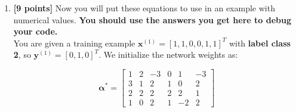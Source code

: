 \documentclass[11pt]{article}
\numberwithin{equation}{section} %
\numberwithin{figure}{section} %
\numberwithin{table}{section} %
\newcommand{\av}{\mathbf{a}}
\newcommand{\bv}{\mathbf{b}}
\newcommand{\xv}{\mathbf{x}}
\newcommand{\yv}{\mathbf{y}}
\newcommand{\zv}{\mathbf{z}}
\newcommand{\betav      }{\boldsymbol \beta      }
\newcommand{\points}[1]{{\bf [#1 points]}}
\begin{document}
\begin{enumerate}
\begin{enumerate}
        
        
        
        \item \points{1} What is the derivative $\frac{d\ell}{d\zv}$? Your answer should be in terms of $\frac{d\ell}{d\bv}$ and $\betav^*$
        
        
        \begin{tcolorbox}[fit,height=3cm, width=6cm, blank, borderline={1pt}{-2pt}]
            \begin{center}\huge$\frac{d\ell}{d\zv} = \betav^* *\frac{d\ell}{d\bv}$
            \end{center}
        \end{tcolorbox}
        
        
        
        
        \item \points{3} What is the derivative $\frac{d\ell}{d\av}$ in terms of $\frac{d\ell}{d\zv}$ and $\zv$
        
        
        \begin{tcolorbox}[fit,height=3cm, width=6cm, blank, borderline={1pt}{-2pt}]
            \begin{center}\huge$\frac{d\ell}{d\av} = \frac{d\ell}{d\zv}\odot\zv\odot(1 - \zv)$
            \end{center}
        \end{tcolorbox}
        
        
        
        \item \points{1} What is the matrix $\frac{d\ell}{d\alpha}$? Your answer should be in terms of $\frac{d\ell}{d\av}$ and $x^{(1)}$.
        
        
        \begin{tcolorbox}[fit,height=3cm, width=6cm, blank, borderline={1pt}{-2pt}]
            \begin{center}\huge$\frac{d\ell}{d\alpha} = \frac{d\ell}{d\av}*x^{(1)^T}$
            \end{center}
        \end{tcolorbox}
        
    \end{enumerate}
\clearpage

\item \points{9} Now you will put these equations to use in an example with numerical values. \textbf{You should use the answers you get here to debug your code.} \\
You are given a training example $\xv^{(1)}=[1,1,0,0,1,1]^T$ with \textbf{label class 2}, so $\yv^{(1)}=[0,1,0]^T$. We initialize the network weights as:
\begin{center}
$$\boldsymbol{\alpha^*}=
    \begin{bmatrix}
    1 & 2 & -3 & 0 & 1 & -3 \\
    3 & 1 & 2 & 1 & 0 & 2 \\
    2 & 2 & 2 & 2 & 2 & 1 \\
    1 & 0 & 2 & 1 & -2 & 2
    \end{bmatrix}$$
    

\end{center}
\end{enumerate}
\end{document}
